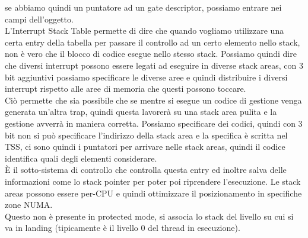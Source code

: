 \documentclass[12pt, oneside]{extbook}
\begin{document}
se abbiamo quindi un puntatore ad un gate descriptor, possiamo entrare nei campi dell'oggetto.\\L'Interrupt Stack Table permette di dire che quando vogliamo utilizzare una certa entry della tabella per passare il controllo ad un certo elemento nello stack, non è vero che il blocco di codice esegue nello stesso stack. Possiamo quindi dire che diversi interrupt possono essere legati ad eseguire in diverse stack areas, con 3 bit aggiuntivi possiamo specificare le diverse aree e quindi distribuire i diversi interrupt rispetto alle aree di memoria che questi possono toccare.\\Ciò permette che sia possibile che se mentre si esegue un codice di gestione venga generata un'altra trap, quindi questa lavorerà su una stack area pulita e la gestione avverrà in maniera corretta. Possiamo specificare dei codici, quindi con 3 bit non si può specificare l'indirizzo della stack area e la specifica è scritta nel TSS, ci sono quindi i puntatori per arrivare nelle stack areas, quindi il codice identifica quali degli elementi considerare.\\È il sotto-sistema di controllo che controlla questa entry ed inoltre salva delle informazioni come lo stack pointer per poter poi riprendere l'esecuzione. Le stack areas possono essere per-CPU e quindi ottimizzare il posizionamento in specifiche zone NUMA.\\Questo non è presente in protected mode, si associa lo stack del livello su cui si va in landing (tipicamente è il livello 0 del thread in esecuzione).
\end{document}
